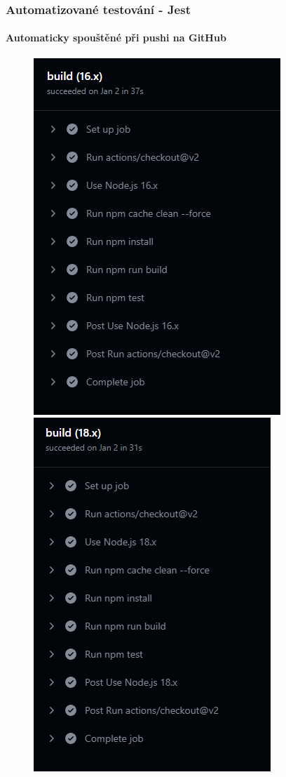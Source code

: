 \begin{frame}
    \frametitle{Automatizované testování - Jest}
    \framesubtitle{Automaticky spouštěné při pushi na GitHub}
    \begin{figure}
        \centering
        \includegraphics[height=0.6\textheight]{../resources/tests-github-16.png}
        \includegraphics[height=0.6\textheight]{../resources/tests-github-18.png}

\end{figure}
\end{frame}
